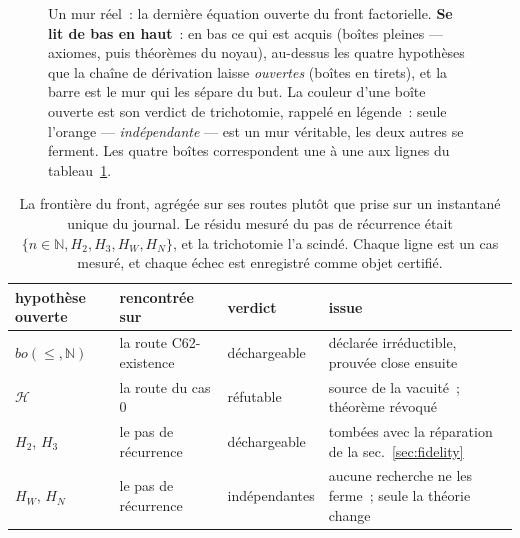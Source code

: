 \documentclass[11pt]{article}
\theoremstyle{remark}\newtheorem{example}{Exemple}
\begin{document}
\begin{figure}[t]
{}
\caption{Un mur réel~: la dernière équation ouverte du front factorielle. \textbf{Se lit
de bas en haut}~: en bas ce qui est acquis (boîtes pleines --- axiomes, puis théorèmes
du noyau), au-dessus les quatre hypothèses que la chaîne de dérivation laisse
\emph{ouvertes} (boîtes en tirets), et la barre est le mur qui les sépare du but. La
couleur d'une boîte ouverte est son verdict de trichotomie, rappelé en légende~: seule
l'orange --- \emph{indépendante} --- est un mur véritable, les deux autres se ferment.
Les quatre boîtes correspondent une à une aux lignes du tableau~\ref{tab:frontier}.}
\label{fig:wall}
\end{figure}

\begin{table}[t]\centering\footnotesize
\begin{tabular}{llll}
\toprule
hypothèse ouverte & rencontrée sur & verdict & issue \\
\midrule
$bo(\le,\mathbb{N})$ & la route C62-existence
  & \textcolor{green!50!black}{déchargeable}
  & déclarée irréductible, prouvée close ensuite \\
$\mathcal{H}$ & la route du cas $0$
  & \textcolor{red!70!black}{réfutable}
  & source de la vacuité~; théorème révoqué \\
$H_2$, $H_3$ & le pas de récurrence
  & \textcolor{green!50!black}{déchargeable}
  & tombées avec la réparation de la sec.~\ref{sec:fidelity} \\
$H_W$, $H_N$ & le pas de récurrence
  & \textcolor{orange!85!black}{indépendantes}
  & aucune recherche ne les ferme~; seule la théorie change \\
\bottomrule
\end{tabular}
\caption{La frontière du front, agrégée sur ses routes plutôt que prise sur un
instantané unique du journal. Le résidu mesuré du pas de récurrence était
$\{n{\in}\mathbb{N}, H_2, H_3, H_W, H_N\}$, et la trichotomie l'a scindé. Chaque
ligne est un cas mesuré, et chaque échec est enregistré comme objet certifié.}
\label{tab:frontier}
\end{table}
\end{document}

